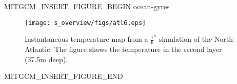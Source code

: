 \begin{rawhtml}MITGCM_INSERT_FIGURE_BEGIN ocean-gyres\end{rawhtml}
\begin{figure}
 \begin{center}
  \texttt{[image: s\_overview/figs/atl6.eps]}
 \end{center}
\caption{Instantaneous temperature map from a $\frac{1}{6}^{\circ }$
simulation of the North Atlantic. The figure
shows the temperature in the second layer (37.5m
deep).}
\label{fig:ocean-gyres}
\end{figure}
\begin{rawhtml}MITGCM_INSERT_FIGURE_END\end{rawhtml}
